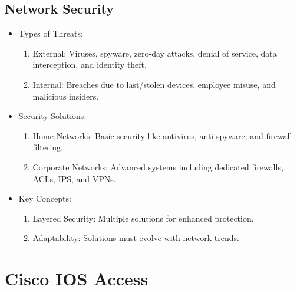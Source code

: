 \documentclass[a4paper,11pt]{article}
\begin{document}
\subsection{Network Security}
\begin{itemize}
    \item Types of Threats:\\
    \begin{enumerate}
        \item External: Viruses, spyware, zero-day attacks. denial of service, data interception, and identity theft.\\
        \item Internal: Breaches due to last/stolen devices, employee misuse, and malicious insiders.\\
    \end{enumerate}
    \item Security Solutions:\\
    \begin{enumerate}
        \item Home Networks: Basic security like antivirus, anti-spyware, and firewall filtering.\\
        \item Corporate Networks: Advanced systems including dedicated firewalls, ACLs, IPS, and VPNs.\\
    \end{enumerate}
    \item Key Concepts:\\
    \begin{enumerate}
        \item Layered Security: Multiple solutions for enhanced protection.\\
        \item Adaptability: Solutions must evolve with network trends.\\
    \end{enumerate}
\end{itemize}

\newpage
\section{Cisco IOS Access}
\end{document}
